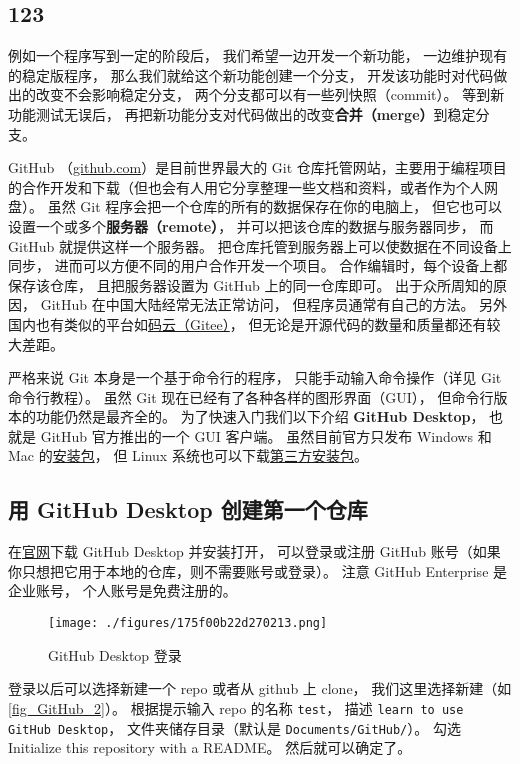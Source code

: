 \subsection{123}
例如一个程序写到一定的阶段后， 我们希望一边开发一个新功能， 一边维护现有的稳定版程序， 那么我们就给这个新功能创建一个分支， 开发该功能时对代码做出的改变不会影响稳定分支， 两个分支都可以有一些列快照（commit）。 等到新功能测试无误后， 再把新功能分支对代码做出的改变\textbf{合并（merge）}到稳定分支。

GitHub （\href{https://github.com}{github.com}）是目前世界最大的 Git 仓库托管网站，主要用于编程项目的合作开发和下载（但也会有人用它分享整理一些文档和资料，或者作为个人网盘）。 虽然 Git 程序会把一个仓库的所有的数据保存在你的电脑上， 但它也可以设置一个或多个\textbf{服务器（remote）}， 并可以把该仓库的数据与服务器同步， 而 GitHub 就提供这样一个服务器。 把仓库托管到服务器上可以使数据在不同设备上同步， 进而可以方便不同的用户合作开发一个项目。 合作编辑时，每个设备上都保存该仓库， 且把服务器设置为 GitHub 上的同一仓库即可。 出于众所周知的原因， GitHub 在中国大陆经常无法正常访问， 但程序员通常有自己的方法。 另外国内也有类似的平台如\href{https://gitee.com/}{码云（Gitee）}， 但无论是开源代码的数量和质量都还有较大差距。

严格来说 Git 本身是一个基于命令行的程序， 只能手动输入命令操作（详见 Git 命令行教程）。 虽然 Git 现在已经有了各种各样的图形界面（GUI）， 但命令行版本的功能仍然是最齐全的。 为了快速入门我们以下介绍 \textbf{GitHub Desktop}， 也就是 GitHub 官方推出的一个 GUI 客户端。 虽然目前官方只发布 Windows 和 Mac 的\href{https://desktop.github.com/}{安装包}， 但 Linux 系统也可以下载\href{https://github.com/shiftkey/desktop/releases}{第三方安装包}。
 
\subsection{用 GitHub Desktop 创建第一个仓库}
在\href{https://desktop.github.com/}{官网}下载 GitHub Desktop 并安装打开， 可以登录或注册 GitHub 账号（如果你只想把它用于本地的仓库，则不需要账号或登录）。 注意 GitHub Enterprise 是企业账号， 个人账号是免费注册的。 %

\begin{figure}[ht]
\centering
\texttt{[image: ./figures/175f00b22d270213.png]}
\caption{GitHub Desktop 登录} \label{fig_GitHub_1}
\end{figure}

登录以后可以选择新建一个 repo 或者从 github 上 clone， 我们这里选择新建（如\autoref{fig_GitHub_2}）。 根据提示输入 repo 的名称 \verb|test|， 描述 \verb|learn to use GitHub Desktop|， 文件夹储存目录（默认是 \verb|Documents/GitHub/|）。 勾选 Initialize this repository with a README。 然后就可以确定了。

